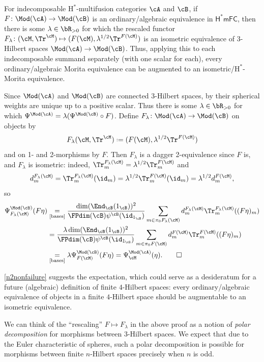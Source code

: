 \documentclass[12pt,reqno]{amsart}
\newcommand{\Hstar}{\ensuremath{\mathrm{H}^{*}}}
\DeclareRobustCommand{\coloneq}{\mathrel{\vcenter{\baselineskip0.5ex\lineskiplimit0pt\hbox{\scriptsize{\upshape.}}\hbox{\scriptsize{\upshape.}}}}=}
\begin{document}
\begin{proposition}
\label{n2nonfailure}
For indecomposable $\Hstar$-multifusion categories $\cA$ and $\cB$, if $F\colon \Mod(\cA)\to\Mod(\cB)$ is an ordinary/algebraic equivalence in $\mathsf{H^*mFC}$, then there is some $\lambda\in\bR_{>0}$ for which the rescaled functor $F_\lambda\colon(\cM,\Tr^\cM)\mapsto(F(\cM),\lambda^{1/2}\Tr^{F(\cM)})$ is an isometric equivalence of 3-Hilbert spaces $\Mod(\cA)\to\Mod(\cB)$. Thus, applying this to each indecomposable summand separately (with one scalar for each), every ordinary/algebraic Morita equivalence can be augmented to an isometric/$\Hstar$-Morita equivalence.
\end{proposition}
\begin{pf}
Since $\Mod (\cA)$ and $\Mod(\cB)$ are connected 3-Hilbert spaces, by \cite[Rmk. 4.50]{3Hilb} their spherical weights are unique up to a positive scalar. Thus there is some $\lambda\in\bR_{>0}$ for which $\Psi^{\Mod(\cA)} = \lambda(\Psi^{\Mod(\cB)}\circ F)$. Define $F_\lambda\colon \Mod(\cA)\to\Mod(\cB)$ on objects by 
\[
F_\lambda(\cM,\Tr^\cM) \coloneq (F(\cM), \lambda^{1/2}\Tr^{F(\cM)})
\]
and on 1- and 2-morphisms by $F$. Then $F_\lambda$ is a dagger 2-equivalence since $F$ is, and $F_\lambda$ is isometric: indeed, $\Tr^{F_\lambda(\cM)}_m=\lambda^{1/2}\Tr^{F(\cM)}_m$ and
\[
d_m^{F_\lambda(\cM)}=\Tr^{F_\lambda(\cM)}_m(\id_m)
=\lambda^{1/2}\Tr^{F(\cM)}_m(\id_m)=\lambda^{1/2}d_m^{F(\cM)},
\]
so
\begin{align*}
\Psi^{\Mod(\cB)}_{F_\lambda(\cM)}(F\eta)
&
\underset{\text{\cite[(7)]{bases}}}{=}
\frac{\dim(\End_\cB(1_\cB))^2}{\FPdim(\cB)\psi^\cB(\id_{1_\cB})}
\sum_{m\in\pi_0 F_\lambda(\cM)}  d_m^{F_\lambda(\cM)}\Tr^{F_\lambda(\cM)}_m((F\eta)_m)
\\&
=
\frac{\lambda\dim(\End_\cB(1_\cB))^2}{\FPdim(\cB)\psi^\cB(\id_{1_\cB})}
\sum_{m\in\pi_0 F(\cM)}  
d_m^{F(\cM)}\Tr^{F(\cM)}_m((F\eta)_m)
\\&
\underset{\text{\cite[(7)]{bases}}}{=}
\lambda\Psi^{\Mod(\cB)}_{F(\cM)}(F\eta)=\Psi^{\Mod(\cA)}_\cM(\eta).\qedhere
\end{align*}
\end{pf}

\cref{n2nonfailure} suggests the expectation, which could serve as a desideratum for a future (algebraic) definition of finite $4$-Hilbert spaces: every ordinary/algebraic equivalence of objects in a finite $4$-Hilbert space should be augmentable to an isometric equivalence. 

We can think of the ``rescaling'' $F\mapsto F_\lambda$ in the above proof as a notion of \emph{polar decomposition} for morphisms between 3-Hilbert spaces. We expect that due to the Euler characteristic of spheres, such a polar decomposition is possible for morphisms between finite $n$-Hilbert spaces precisely when $n$ is odd.
\end{document}
